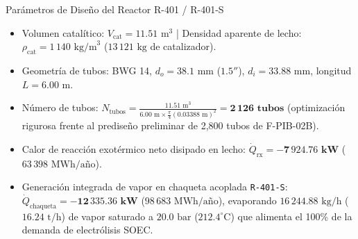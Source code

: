 \documentclass[11pt,letterpaper]{article}
\begin{document}
\begin{equationbox}{Parámetros de Diseño del Reactor R-401 / R-401-S}
\begin{itemize}
    \item Volumen catalítico: $V_{\text{cat}} = 11.51\text{ m}^3$ | Densidad aparente de lecho: $\rho_{\text{cat}} = 1\,140\text{ kg/m}^3$ ($13\,121\text{ kg}$ de catalizador).
    \item Geometría de tubos: BWG 14, $d_o = 38.1\text{ mm}$ ($1.5''$), $d_i = 33.88\text{ mm}$, longitud $L = 6.00\text{ m}$.
    \item Número de tubos: $N_{\text{tubos}} = \frac{11.51\text{ m}^3}{6.00\text{ m} \times \frac{\pi}{4}(0.03388\text{ m})^2} = \mathbf{2\,126\text{ tubos}}$ (optimización rigurosa frente al prediseño preliminar de 2,800 tubos de F-PIB-02B).
    \item Calor de reacción exotérmico neto disipado en lecho: $\dot{Q}_{\text{rx}} = \mathbf{-7\,924.76\text{ kW}}$ ($63\,398\text{ MWh/año}$).
    \item Generación integrada de vapor en chaqueta acoplada \texttt{R-401-S}: $\dot{Q}_{\text{chaqueta}} = \mathbf{-12\,335.36\text{ kW}}$ ($98\,683\text{ MWh/año}$), evaporando $16\,244.88\text{ kg/h}$ ($16.24\text{ t/h}$) de vapor saturado a $20.0\text{ bar}$ ($212.4^\circ\text{C}$) que alimenta el 100\% de la demanda de electrólisis SOEC.
\end{itemize}
\end{equationbox}
\end{document}
